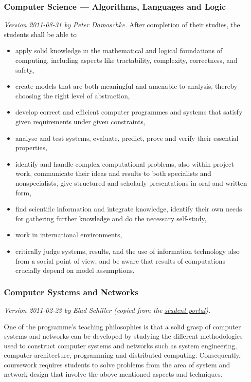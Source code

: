 \documentclass[twocolumn]{article}
\newcommand{\meta}[1]{{\small \emph{#1}}}
\begin{document}
\subsubsection{Computer Science --- Algorithms, Languages and Logic}
\meta{Version 2011-08-31 by Peter Damaschke.}
After completion of their studies, the students shall be able to
\begin{itemize}
\item apply solid knowledge in the mathematical and logical
  foundations of computing, including aspects like tractability,
  complexity, correctness, and safety,
\item create models that are both meaningful and amenable to analysis,
  thereby choosing the right level of abstraction,
\item develop correct and efficient computer programmes and systems
  that satisfy given requirements under given constraints,
\item analyse and test systems, evaluate, predict, prove and verify
  their essential properties,
\item identify and handle complex computational problems, also within
  project work, communicate their ideas and results to both
  specialists and nonspecialists, give structured and scholarly
  presentations in oral and written form,
\item find scientific information and integrate knowledge, identify
  their own needs for gathering further knowledge and do the necessary
  self-study,
\item work in international environments,
\item critically judge systems, results, and the use of information
  technology also from a social point of view, and be aware that
  results of computations crucially depend on model assumptions.
\end{itemize}

\subsubsection{Computer Systems and Networks}%
\meta{Version 2011-02-23 by Elad Schiller (copied from the
  \href{https://www.student.chalmers.se/sp/program?program_id=814}{student
    portal}).}

One of the programme's teaching philosophies is that a solid grasp of
computer systems and networks can be developed by studying the
different methodologies used to construct computer systems and
networks such as system engineering, computer architecture,
programming and distributed computing. Consequently, coursework
requires students to solve problems from the area of system and
network design that involve the above mentioned aspects and techniques.
\end{document}
